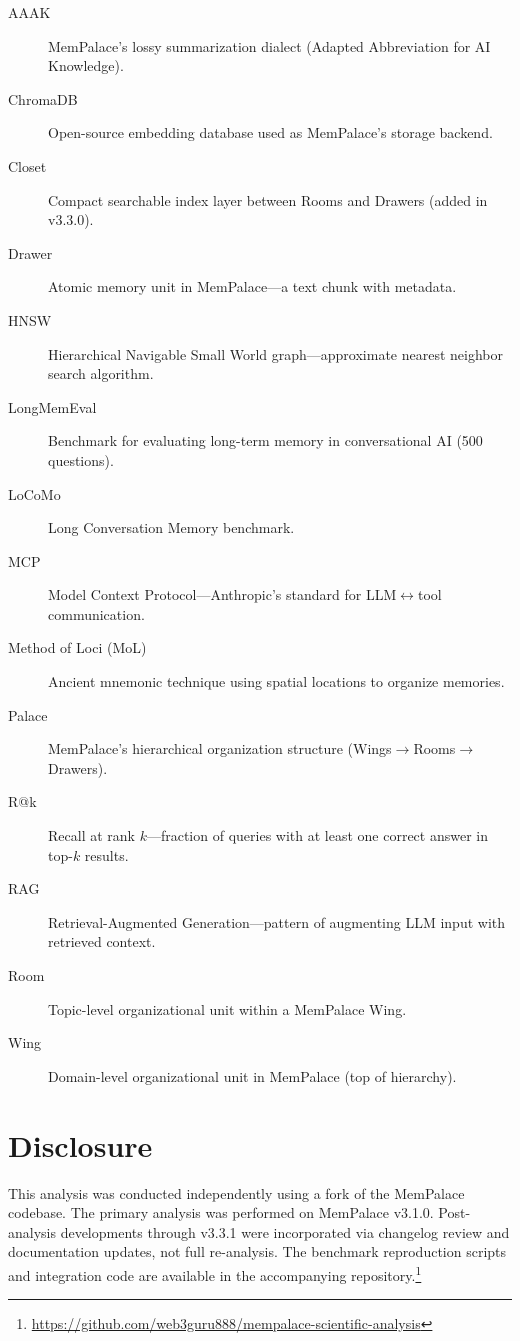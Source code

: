 \documentclass[twoside,11pt]{article}
\begin{document}
\begin{description}
\item[AAAK] MemPalace's lossy summarization dialect (Adapted Abbreviation for AI Knowledge).
\item[ChromaDB] Open-source embedding database used as MemPalace's storage backend.
\item[Closet] Compact searchable index layer between Rooms and Drawers (added in v3.3.0).
\item[Drawer] Atomic memory unit in MemPalace---a text chunk with metadata.
\item[HNSW] Hierarchical Navigable Small World graph---approximate nearest neighbor search algorithm.
\item[LongMemEval] Benchmark for evaluating long-term memory in conversational AI (500 questions).
\item[LoCoMo] Long Conversation Memory benchmark.
\item[MCP] Model Context Protocol---Anthropic's standard for LLM$\leftrightarrow$tool communication.
\item[Method of Loci (MoL)] Ancient mnemonic technique using spatial locations to organize memories.
\item[Palace] MemPalace's hierarchical organization structure (Wings$\to$Rooms$\to$Drawers).
\item[R@k] Recall at rank $k$---fraction of queries with at least one correct answer in top-$k$ results.
\item[RAG] Retrieval-Augmented Generation---pattern of augmenting LLM input with retrieved context.
\item[Room] Topic-level organizational unit within a MemPalace Wing.
\item[Wing] Domain-level organizational unit in MemPalace (top of hierarchy).
\end{description}

\section{Disclosure}
\label{app:disclosure}

This analysis was conducted independently using a fork of the MemPalace
codebase.  The primary analysis was performed on MemPalace v3.1.0.
Post-analysis developments through v3.3.1 were incorporated via changelog
review and documentation updates, not full re-analysis.  The benchmark
reproduction scripts and integration code are available in the accompanying
repository.\footnote{\url{https://github.com/web3guru888/mempalace-scientific-analysis}}
\end{document}
